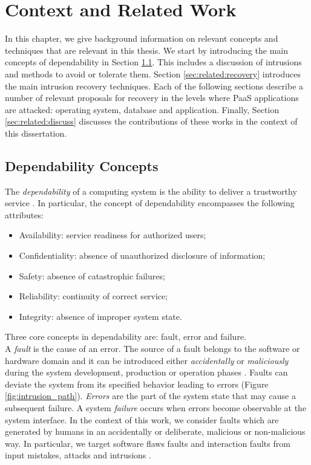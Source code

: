 \chapter{Context and Related Work}
\label{chapter:related_work}
In this chapter, we give background information on relevant concepts and techniques that are relevant in this thesis. We start by introducing the main concepts of dependability in Section \ref{sec:related:dependability_concepts}. This includes a discussion of intrusions and methods to avoid or tolerate them. Section \ref{sec:related:recovery} introduces the main intrusion recovery techniques. Each of the following sections describe a number of relevant proposals for recovery in the levels where \ac{PaaS} applications are attacked: operating system, database and application. Finally, Section \ref{sec:related:discuss} discusses the contributions of these works in the context of this dissertation.

\section{Dependability Concepts}
\label{sec:related:dependability_concepts}
The \emph{dependability} of a computing system is the ability to deliver a trustworthy service \cite{Aviz}. In particular, the concept of dependability encompasses the following attributes: 
\begin{itemize}
\item Availability: service readiness for authorized users; 
\item Confidentiality: absence of unauthorized disclosure of information; 
\item Safety: absence of catastrophic failures; 
\item Reliability: continuity of correct service; 
\item Integrity: absence of improper system state.
\end{itemize}
\bigskip

Three core concepts in dependability are: fault, error and failure.\\
A \emph{fault} is the cause of an error. The source of a fault belongs to the software or hardware domain and it can be introduced either \emph{accidentally} or \emph{maliciously} during the system development, production or operation phases \cite{Landwehr1992,Aviz}. Faults can deviate the system from its specified behavior leading to errors (Figure \ref{fig:intrusion_path}). \emph{Errors} are the part of the system state that may cause a subsequent failure. A system \emph{failure} occurs when errors become observable at the system interface. In the context of this work, we consider faults which are generated by humans in an accidentally or deliberate, malicious or non-malicious way. In particular, we target software flaws faults and interaction faults from input mistakes, attacks and intrusions \cite{Aviz}. \\  

